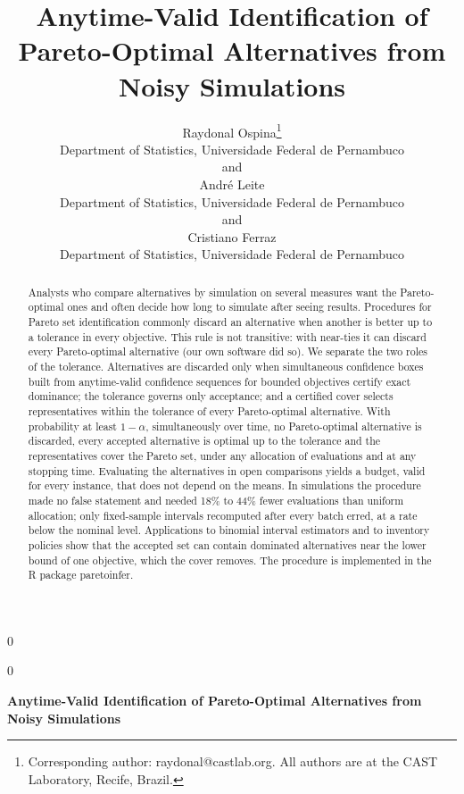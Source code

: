 \documentclass[12pt]{article}
\newcommand{\blind}{0}
\newcommand{\spacingset}[1]{\renewcommand{\baselinestretch}{#1}\small\normalsize}
\theoremstyle{definition}
\begin{document}
\def\spacingset#1{\renewcommand{\baselinestretch}%
{#1}\small\normalsize} \spacingset{1}

\blind
{
  \title{\bf Anytime-Valid Identification of Pareto-Optimal Alternatives from Noisy Simulations}
  \author{Raydonal Ospina\thanks{Corresponding author: raydonal@castlab.org. All authors are at the CAST Laboratory, Recife, Brazil.}\hspace{.2cm}\\
    Department of Statistics, Universidade Federal de Pernambuco\\
    and \\
    Andr\'e Leite \\
    Department of Statistics, Universidade Federal de Pernambuco\\
    and \\
    Cristiano Ferraz \\
    Department of Statistics, Universidade Federal de Pernambuco}
  \maketitle
} \fi

\blind
{
  \bigskip
  \bigskip
  \bigskip
  \begin{center}
    {\LARGE\bf Anytime-Valid Identification of Pareto-Optimal Alternatives from Noisy Simulations}
\end{center}
  \medskip
} \fi

\begin{abstract}
Analysts who compare alternatives by simulation on several measures want the Pareto-optimal ones and often decide how long to simulate after seeing results. Procedures for Pareto set identification commonly discard an alternative when another is better up to a tolerance in every objective. This rule is not transitive: with near-ties it can discard every Pareto-optimal alternative (our own software did so). We separate the two roles of the tolerance. Alternatives are discarded only when simultaneous confidence boxes built from anytime-valid confidence sequences for bounded objectives certify exact dominance; the tolerance governs only acceptance; and a certified cover selects representatives within the tolerance of every Pareto-optimal alternative. With probability at least $1-\alpha$, simultaneously over time, no Pareto-optimal alternative is discarded, every accepted alternative is optimal up to the tolerance and the representatives cover the Pareto set, under any allocation of evaluations and at any stopping time. Evaluating the alternatives in open comparisons yields a budget, valid for every instance, that does not depend on the means. In simulations the procedure made no false statement and needed 18\% to 44\% fewer evaluations than uniform allocation; only fixed-sample intervals recomputed after every batch erred, at a rate below the nominal level. Applications to binomial interval estimators and to inventory policies show that the accepted set can contain dominated alternatives near the lower bound of one objective, which the cover removes. The procedure is implemented in the R package \textsf{paretoinfer}.
\end{abstract}
\end{document}
